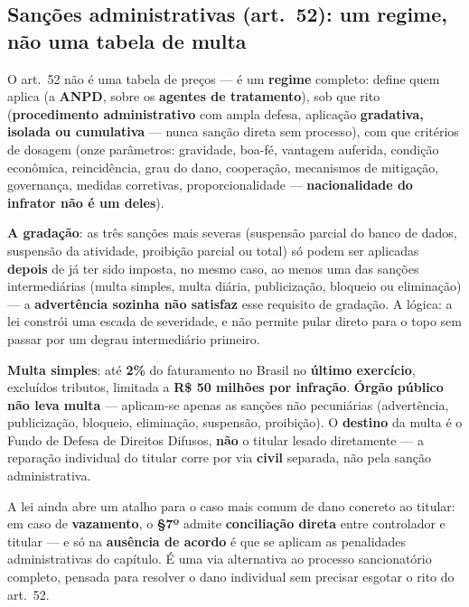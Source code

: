 \subsection{Sanções administrativas (art.\ 52): um regime, não uma tabela de multa}

\begin{conceito}
O art.\ 52 não é uma tabela de preços --- é um \textbf{regime} completo:
define quem aplica (a \textbf{ANPD}, sobre os \textbf{agentes de
tratamento}), sob que rito (\textbf{procedimento administrativo} com ampla
defesa, aplicação \textbf{gradativa, isolada ou cumulativa} --- nunca
sanção direta sem processo), com que critérios de dosagem (onze
parâmetros: gravidade, boa-fé, vantagem auferida, condição econômica,
reincidência, grau do dano, cooperação, mecanismos de mitigação,
governança, medidas corretivas, proporcionalidade --- \textbf{nacionalidade
do infrator não é um deles}).

\textbf{A gradação}: as três sanções mais severas (suspensão parcial do
banco de dados, suspensão da atividade, proibição parcial ou total) só
podem ser aplicadas \textbf{depois} de já ter sido imposta, no mesmo caso,
ao menos uma das sanções intermediárias (multa simples, multa diária,
publicização, bloqueio ou eliminação) --- a \textbf{advertência sozinha
não satisfaz} esse requisito de gradação. A lógica: a lei constrói uma
escada de severidade, e não permite pular direto para o topo sem passar
por um degrau intermediário primeiro.

\textbf{Multa simples}: até \textbf{2\%} do faturamento no Brasil no
\textbf{último exercício}, excluídos tributos, limitada a \textbf{R\$ 50
milhões por infração}. \textbf{Órgão público não leva multa} --- aplicam-se
apenas as sanções não pecuniárias (advertência, publicização, bloqueio,
eliminação, suspensão, proibição). O \textbf{destino} da multa é o Fundo
de Defesa de Direitos Difusos, \textbf{não} o titular lesado diretamente
--- a reparação individual do titular corre por via \textbf{civil}
separada, não pela sanção administrativa.

A lei ainda abre um atalho para o caso mais comum de dano concreto ao
titular: em caso de \textbf{vazamento}, o \textbf{§7º} admite
\textbf{conciliação direta} entre controlador e titular --- e só na
\textbf{ausência de acordo} é que se aplicam as penalidades administrativas
do capítulo. É uma via alternativa ao processo sancionatório completo,
pensada para resolver o dano individual sem precisar esgotar o rito do
art.\ 52.
\end{conceito}

